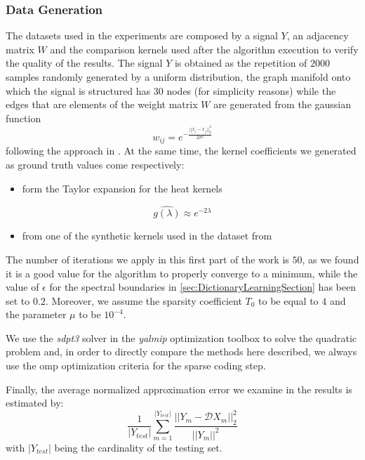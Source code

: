 \subsubsection{Data Generation}
The datasets used in the experiments are composed by a signal $Y$, an adjacency matrix $W$ and the comparison kernels used after the algorithm execution to verify the quality of the results. The signal $Y$ is obtained as the repetition of $2000$ samples randomly generated by a uniform distribution, the graph manifold onto which the signal is structured has $30$ nodes (for simplicity reasons) while the edges that are elements of the weight matrix $W$ are generated from the gaussian function
\begin{equation}
  w_{ij} = e^{-\frac{||x_i - x_j||_2^2}{2\sigma^2}}
\end{equation}
following the approach in \cite{Kalofolias2016}. At the same time, the kernel coefficients we generated as ground truth values come respectively:
\begin{itemize}
  \item form the Taylor expansion for the heat kernels
\end{itemize}
\begin{equation}
  \hat{g(\lambda)} \approx e^{-2\lambda}
\end{equation}
\begin{itemize}
  \item from one of the synthetic kernels used in the dataset from \cite{Thanou2014}
\end{itemize}

The number of iterations we apply in this first part of the work is $50$, as we found it is a good value for the algorithm to properly converge to a minimum, while the value of $\epsilon$ for the spectral boundaries in \autoref{sec:DictionaryLearningSection} has been set to $0.2$. Moreover, we assume the sparsity coefficient $T_0$ to be equal to $4$ and the parameter $\mu$ to be $10^{-4}$.

We use the \textit{sdpt3} solver in the \textit{yalmip} optimization toolbox to solve the quadratic problem and, in order to directly compare the methods here described, we always use the \gls{omp} optimization criteria for the sparse coding step.

Finally, the average normalized approximation error we examine in the results is estimated by:
\begin{equation}
  \frac{1}{|Y_{test}|}\sum_{m=1}^{|Y_{test}|}\frac{||Y_m - \mathcal{D}X_m||_2^2}{||Y_m||^2}
\end{equation}
with $|Y_{test}|$ being the cardinality of the testing set.


